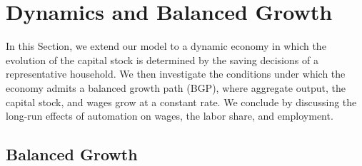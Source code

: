 \documentclass[12pt]{article}
\newcommand{\CiteReference}{../reference.bib}
\theoremstyle{definition}
\begin{document}
\section{Dynamics and Balanced Growth}

In this Section, we extend our model to a dynamic economy in which the evolution of the capital stock is determined by the saving decisions of a representative household. We then investigate the conditions under which the economy admits a balanced growth path (BGP), where aggregate output, the capital stock, and wages grow at a constant rate. We conclude by discussing the long-run effects of automation on wages, the labor share, and employment. 

\subsection{Balanced Growth}




\end{document}
